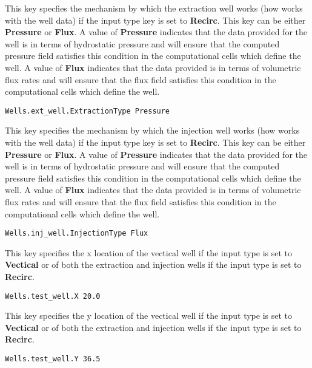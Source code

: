 {
This key specfies the mechanism by which the extraction well works (how
\parflow{} works with the well data) if the input type key is set to
{\bf Recirc}.  This key can be either {\bf Pressure} or {\bf Flux}.  A
value of {\bf Pressure} indicates that the data provided for the well is
in terms of hydrostatic pressure and \parflow{} will ensure that the
computed pressure field satisfies this condition in the computational
cells which define the well.  A value of {\bf Flux} indicates that the
data provided is in terms of volumetric flux rates and \parflow{} will
ensure that the flux field satisfies this condition in the computational
cells which define the well.
}
\begin{display}\begin{verbatim}
Wells.ext_well.ExtractionType Pressure
\end{verbatim}\end{display}

{
This key specifies the mechanism by which the injection well works (how
\parflow{} works with the well data) if the input type key is set to
{\bf Recirc}.  This key can be either {\bf Pressure} or {\bf Flux}.  A
value of {\bf Pressure} indicates that the data provided for the well is
in terms of hydrostatic pressure and \parflow{} will ensure that the
computed pressure field satisfies this condition in the computational
cells which define the well.  A value of {\bf Flux} indicates that the
data provided is in terms of volumetric flux rates and \parflow{} will
ensure that the flux field satisfies this condition in the computational
cells which define the well.
}
\begin{display}\begin{verbatim}
Wells.inj_well.InjectionType Flux
\end{verbatim}\end{display}

{
This key specifies the x location of the vectical well if the input
type is set to {\bf Vectical} or of both the extraction and injection
wells if the input type is set to {\bf Recirc}.
}
\begin{display}\begin{verbatim}
Wells.test_well.X 20.0
\end{verbatim}\end{display}

{
This key specifies the y location of the vectical well if the input
type is set to {\bf Vectical} or of both the extraction and injection
wells if the input type is set  to {\bf Recirc}.
}
\begin{display}\begin{verbatim}
Wells.test_well.Y 36.5
\end{verbatim}\end{display}

